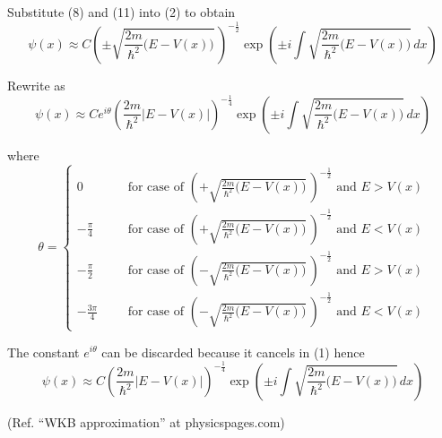 Substitute (8) and (11) into (2) to obtain
\begin{equation*}
\psi(x)\approx C
\left(\pm\sqrt{\frac{2m}{\hbar^2}\bigl(E-V(x)\bigr)}\,\right)^{-\frac{1}{2}}
\exp\left(\pm i\int\sqrt{\frac{2m}{\hbar^2}\bigl(E-V(x)\bigr)}\,dx\right)
\end{equation*}

Rewrite as
\begin{equation*}
\psi(x)\approx Ce^{i\theta}
\left(\frac{2m}{\hbar^2}\bigl|E-V(x)\bigr|\right)^{-\frac{1}{4}}
\exp\left(\pm i\int\sqrt{\frac{2m}{\hbar^2}\bigl(E-V(x)\bigr)}\,dx\right)
\tag{12}
\end{equation*}

where
\begin{equation*}
\theta=\left\{
\begin{aligned}
0& &
&\text{for case of $\left(+\sqrt{\frac{2m}{\hbar^2}\bigl(E-V(x)\bigr)}\,\right)^{-\frac{1}{2}}$ and $E>V(x)$}
\\[1ex]
-\frac{\pi}{4}& &
&\text{for case of $\left(+\sqrt{\frac{2m}{\hbar^2}\bigl(E-V(x)\bigr)}\,\right)^{-\frac{1}{2}}$ and $E<V(x)$}
\\[1ex]
-\frac{\pi}{2}& &
&\text{for case of $\left(-\sqrt{\frac{2m}{\hbar^2}\bigl(E-V(x)\bigr)}\,\right)^{-\frac{1}{2}}$ and $E>V(x)$}
\\[1ex]
-\frac{3\pi}{4}& &
&\text{for case of $\left(-\sqrt{\frac{2m}{\hbar^2}\bigl(E-V(x)\bigr)}\,\right)^{-\frac{1}{2}}$ and $E<V(x)$}
\end{aligned}
\right.
\end{equation*}

The constant $e^{i\theta}$ can be discarded because it cancels in (1) hence
\begin{equation*}
\psi(x)\approx C
\left(\frac{2m}{\hbar^2}\bigl|E-V(x)\bigr|\right)^{-\frac{1}{4}}
\exp\left(\pm i\int\sqrt{\frac{2m}{\hbar^2}\bigl(E-V(x)\bigr)}\,dx\right)
\end{equation*}

(Ref. ``WKB approximation'' at physicspages.com)



